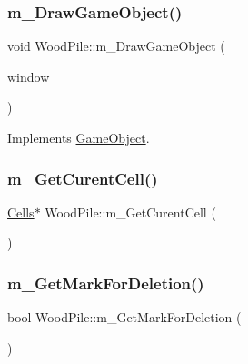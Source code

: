 \subsubsection{\texorpdfstring{m\+\_\+\+Draw\+Game\+Object()}{m\_DrawGameObject()}}
{\footnotesize\ttfamily void Wood\+Pile\+::m\+\_\+\+Draw\+Game\+Object (\begin{DoxyParamCaption}\item[{sf\+::\+Render\+Window \&}]{window }\end{DoxyParamCaption})\hspace{0.3cm}{\ttfamily [virtual]}}



Implements \mbox{\hyperlink{class_game_object_a184ac59fd5167c55a54b50894e5b6721}{Game\+Object}}.

\mbox{\label{class_wood_pile_ac5f5d04824b12b5e31ffe1d4ba92dbf5}} 
\subsubsection{\texorpdfstring{m\+\_\+\+Get\+Curent\+Cell()}{m\_GetCurentCell()}}
{\footnotesize\ttfamily \mbox{\hyperlink{class_cells}{Cells}}$\ast$ Wood\+Pile\+::m\+\_\+\+Get\+Curent\+Cell (\begin{DoxyParamCaption}{ }\end{DoxyParamCaption})}

\mbox{\label{class_wood_pile_aa0e4d61a9d9b42b4ec4b0f129f6b60d6}} 
\subsubsection{\texorpdfstring{m\+\_\+\+Get\+Mark\+For\+Deletion()}{m\_GetMarkForDeletion()}}
{\footnotesize\ttfamily bool Wood\+Pile\+::m\+\_\+\+Get\+Mark\+For\+Deletion (\begin{DoxyParamCaption}{ }\end{DoxyParamCaption})}

\mbox{\label{class_wood_pile_a19156e17630117c4e031ccd594101d1a}} 
